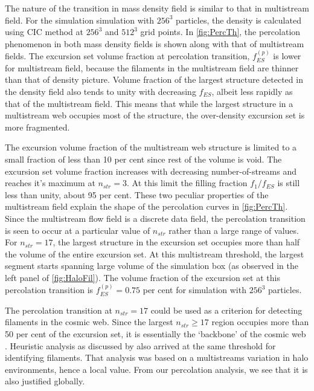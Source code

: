 The nature of the transition in mass density field is similar to that in multistream field. For the simulation simulation with $256^3$ particles, the density is calculated using CIC method at $256^3$ and $512^3$ grid points. In \autoref{fig:PercTh}, the percolation phenomenon in both mass density fields is shown along with that of multistream fields. The excursion set volume fraction at percolation transition, $f_{ES}^{(p)}$ is lower for multistream field, because the filaments in the multistream field are thinner than that of density picture. Volume fraction of the largest structure detected in the density field also tends to unity with decreasing $f_{ES}$, albeit less rapidly as that of the multistream field. This means that while the largest structure in a multistream web occupies most of the structure, the over-density excursion set is more fragmented.
  







The excursion volume fraction of the multistream web structure is limited to a small fraction of  less than 10 per cent since rest of the volume is void. The excursion set volume fraction increases with decreasing number-of-streams and reaches it's maximum at $n_{str} = 3$.  At this limit the filling fraction $f_1/f_{ES}$ is still less than unity, about 95 per cent. These two peculiar properties of the multistream field explain the shape of the percolation curves in \autoref{fig:PercTh}.
Since the multistream flow field is a discrete data field, the percolation transition is seen to occur at a particular value of $n_{str}$ rather than a large range of values. For $n_{str} = 17$, the largest structure in the excursion set occupies more than half the volume of the entire excursion set. At this multistream threshold, the largest segment starts spanning large volume of the simulation box (as observed in the left panel of \autoref{fig:HaloFil}). The volume fraction of the excursion set at this percolation transition is $f_{ES}^{(p)} = 0.75$ per cent for simulation with $256^3$ particles. 

The percolation transition at $n_{str} = 17$ could be used as a criterion for detecting filaments in the cosmic web. Since the largest $n_{str} \geq 17$ region occupies more than 50 per cent of the excursion set, it is essentially the `backbone' of the cosmic web \citep{Shandarin2010b}. Heuristic analysis as discussed by \cite{Ramachandra2015} also arrived at the same threshold for identifying filaments. That analysis was based on a multistreams variation in halo environments, hence a local value. From our percolation analysis, we see that it is also justified globally. 



